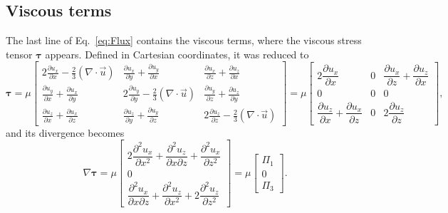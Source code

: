 \documentclass[wes, manuscript]{copernicus}
\begin{document}
\subsection{Viscous terms}
The last line of Eq.~\eqref{eq:Flux} contains the viscous terms, where the viscous stress tensor
$\boldsymbol{\tau}$ appears. Defined in Cartesian coordinates, it was reduced to
%
\begin{equation}
\boldsymbol{\tau} = \mu
\begin{bmatrix}
2 \frac{\partial u_{x}}{\partial x} - \frac{2}{3} (\nabla\!\cdot\!\vec{u}) &
\frac{\partial u_{x}}{\partial y} + \frac{\partial u_{y}}{\partial x} &
\frac{\partial u_{x}}{\partial z} + \frac{\partial u_z}{\partial x} \\[6pt]
\frac{\partial u_{y}}{\partial x} + \frac{\partial u_{x}}{\partial y} &
2 \frac{\partial u_{y}}{\partial y} - \frac{2}{3} (\nabla\!\cdot\!\vec{u}) &
\frac{\partial u_{y}}{\partial z} + \frac{\partial u_z}{\partial y} \\[6pt]
\frac{\partial u_z}{\partial x} + \frac{\partial u_{x}}{\partial z} &
\frac{\partial u_z}{\partial y} + \frac{\partial u_{y}}{\partial z} &
2 \frac{\partial u_z}{\partial z} - \frac{2}{3} (\nabla\!\cdot\!\vec{u})
\end{bmatrix}
=
\mu
\begin{bmatrix}
2 \dfrac{\partial u_{x}}{\partial x} & 0 & \dfrac{\partial u_{x}}{\partial z}+\dfrac{\partial u_{z}}{\partial x} \\[8pt]
0 & 0 & 0 \\[8pt]
\dfrac{\partial u_{z}}{\partial x}+\dfrac{\partial u_{x}}{\partial z} & 0 & 2 \dfrac{\partial u_{z}}{\partial z}
\end{bmatrix},
\end{equation}
%
and its divergence becomes
%
\begin{equation}
\nabla \boldsymbol{\tau}=\mu
\begin{bmatrix}
2 \dfrac{\partial^2 u_{x}}{\partial x^2}
+\dfrac{\partial^2 u_{z}}{\partial x \partial z}
+\dfrac{\partial^2 u_{x}}{\partial z^2} \\[10pt]
0 \\[10pt]
\dfrac{\partial^2 u_{x}}{\partial x \partial z}
+\dfrac{\partial^2 u_{z}}{\partial x^2}
+2 \dfrac{\partial^2 u_{z}}{\partial z^2}
\end{bmatrix}
=
\mu
\begin{bmatrix}
\Pi_1 \\[6pt]
0 \\[6pt]
\Pi_3
\end{bmatrix}.
\end{equation}
\end{document}
